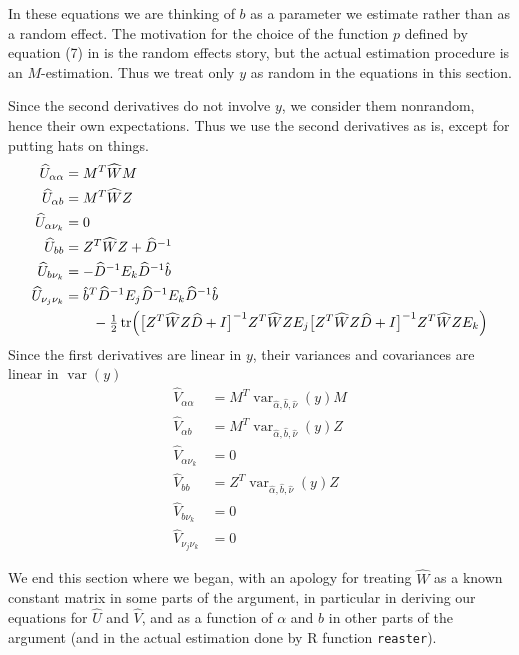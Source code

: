 \documentclass[11pt]{article}
\DeclareMathOperator{\var}{var}
\DeclareMathOperator{\tr}{tr}
\let\code=\texttt
\begin{document}
In these equations we are thinking of $b$ as a parameter we estimate
rather than as a random effect.  The motivation for the choice of the
function $p$ defined by equation (7) in \citet{reaster} is the random
effects story, but the actual estimation procedure is an $M$-estimation.
Thus we treat only $y$ as random in the equations in this section.

Since the second derivatives do not involve $y$, we consider them nonrandom,
hence their own expectations.  Thus we use the second derivatives as is,
except for putting hats on things.
\begin{align*}
   \widehat{U}_{\alpha \alpha}
   & =
   M^T \widehat{W} M
   \\
   \widehat{U}_{\alpha b}
   & =
   M^T \widehat{W} Z
   \\
   \widehat{U}_{\alpha \nu_k}
   & =
   0
   \\
   \widehat{U}_{b b}
   & =
   Z^T \widehat{W} Z + \widehat{D}^{- 1}
   \\
   \widehat{U}_{b \nu_k}
   & =
   - \widehat{D}^{- 1} E_k \widehat{D}^{- 1} \hat{b}
   \\
   \widehat{U}_{\nu_j \nu_k}
   & =
   \hat{b}^T \widehat{D}^{- 1} E_j \widehat{D}^{- 1} E_k \widehat{D}^{- 1} \hat{b}
   \\
   & \qquad
   -
   \tfrac{1}{2} \tr \Bigl(
   \bigl[ Z^T \widehat{W} Z \widehat{D} + I \bigr]^{- 1}
   Z^T \widehat{W} Z E_j
   \bigl[ Z^T \widehat{W} Z \widehat{D} + I \bigr]^{- 1}
   Z^T \widehat{W} Z E_k
   \Bigr)
\end{align*}
Since the first derivatives are linear in $y$, their variances and covariances
are linear in $\var(y)$
\begin{align*}
   \widehat{V}_{\alpha \alpha}
   & =
   M^T \var_{\hat{\alpha}, \hat{b}, \hat{\nu}}(y) M
   \\
   \widehat{V}_{\alpha b}
   & =
   M^T \var_{\hat{\alpha}, \hat{b}, \hat{\nu}}(y) Z
   \\
   \widehat{V}_{\alpha \nu_k}
   & =
   0
   \\
   \widehat{V}_{b b}
   & =
   Z^T \var_{\hat{\alpha}, \hat{b}, \hat{\nu}}(y) Z
   \\
   \widehat{V}_{b \nu_k}
   & =
   0
   \\
   \widehat{V}_{\nu_j \nu_k}
   & =
   0
\end{align*}

We end this section where we began, with an apology for treating
$\widehat{W}$ as a known constant matrix in some parts of the argument,
in particular in deriving our equations for $\widehat{U}$ and $\widehat{V}$,
and as a function of $\alpha$ and $b$ in other parts of the argument
(and in the actual estimation done by R function \code{reaster}).
\end{document}
